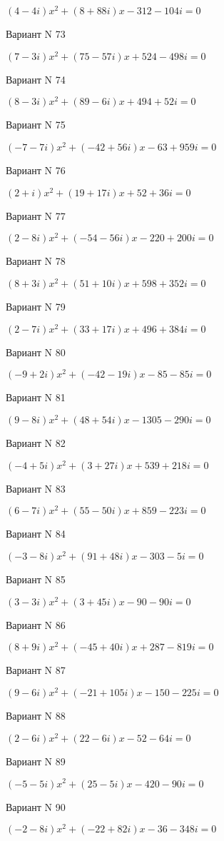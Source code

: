 \documentclass[11pt]{report}
\begin{document}
$(4 - 4 i)x^2 + (8 + 88 i)x  -312 - 104 i = 0$

Вариант N 73

$(7 - 3 i)x^2 + (75 - 57 i)x + 524 - 498 i = 0$

Вариант N 74

$(8 - 3 i)x^2 + (89 - 6 i)x + 494 + 52 i = 0$

Вариант N 75

$(-7 - 7 i)x^2 + (-42 + 56 i)x  -63 + 959 i = 0$

Вариант N 76

$(2 + i)x^2 + (19 + 17 i)x + 52 + 36 i = 0$

Вариант N 77

$(2 - 8 i)x^2 + (-54 - 56 i)x  -220 + 200 i = 0$

Вариант N 78

$(8 + 3 i)x^2 + (51 + 10 i)x + 598 + 352 i = 0$

Вариант N 79

$(2 - 7 i)x^2 + (33 + 17 i)x + 496 + 384 i = 0$

Вариант N 80

$(-9 + 2 i)x^2 + (-42 - 19 i)x  -85 - 85 i = 0$

Вариант N 81

$(9 - 8 i)x^2 + (48 + 54 i)x  -1305 - 290 i = 0$

Вариант N 82

$(-4 + 5 i)x^2 + (3 + 27 i)x + 539 + 218 i = 0$

Вариант N 83

$(6 - 7 i)x^2 + (55 - 50 i)x + 859 - 223 i = 0$

Вариант N 84

$(-3 - 8 i)x^2 + (91 + 48 i)x  -303 - 5 i = 0$

Вариант N 85

$(3 - 3 i)x^2 + (3 + 45 i)x  -90 - 90 i = 0$

Вариант N 86

$(8 + 9 i)x^2 + (-45 + 40 i)x + 287 - 819 i = 0$

Вариант N 87

$(9 - 6 i)x^2 + (-21 + 105 i)x  -150 - 225 i = 0$

Вариант N 88

$(2 - 6 i)x^2 + (22 - 6 i)x  -52 - 64 i = 0$

Вариант N 89

$(-5 - 5 i)x^2 + (25 - 5 i)x  -420 - 90 i = 0$

Вариант N 90

$(-2 - 8 i)x^2 + (-22 + 82 i)x  -36 - 348 i = 0$
\end{document}
